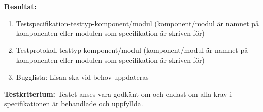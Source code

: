 \documentclass[a4paper,10pt]{article}
\begin{document}
\textbf{Resultat:}
    \begin{enumerate}
        \item \label{itm:Testspecifikation-a}
        Testspecifikation-testtyp-komponent/modul (komponent/modul är namnet på
        komponenten eller modulen som specifikation är skriven för)
        \item \label{itm:Testprotokoll-a} Testprotokoll-testtyp-komponent/modul
        (komponent/modul är namnet på komponenten eller modulen som
        specifikation är skriven för)
        \item Bugglista: Lisan ska vid behov uppdateras
    \end{enumerate}

\textbf{Testkriterium:} Testet anses vara godkänt om och endast om alla krav i specifikationen är behandlade och uppfyllda.
\clearpage
\printbibliography
\end{document}
